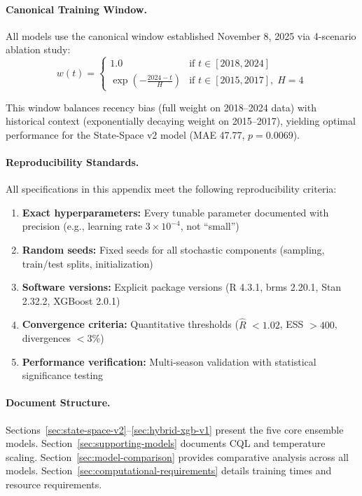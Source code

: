 \paragraph{Canonical Training Window.}
All models use the canonical window established November 8, 2025 via 4-scenario ablation study:
\begin{equation}
w(t) = \begin{cases}
1.0 & \text{if } t \in [2018, 2024] \\
\exp\left(-\frac{2024 - t}{H}\right) & \text{if } t \in [2015, 2017], \; H = 4
\end{cases}
\end{equation}

\noindent This window balances recency bias (full weight on 2018--2024 data) with historical context (exponentially decaying weight on 2015--2017), yielding optimal performance for the State-Space v2 model (MAE 47.77, $p = 0.0069$).

\paragraph{Reproducibility Standards.}
All specifications in this appendix meet the following reproducibility criteria:
\begin{enumerate}[itemsep=2pt,parsep=0pt]
    \item \textbf{Exact hyperparameters:} Every tunable parameter documented with precision (e.g., learning rate $3 \times 10^{-4}$, not ``small'')
    \item \textbf{Random seeds:} Fixed seeds for all stochastic components (sampling, train/test splits, initialization)
    \item \textbf{Software versions:} Explicit package versions (R 4.3.1, brms 2.20.1, Stan 2.32.2, XGBoost 2.0.1)
    \item \textbf{Convergence criteria:} Quantitative thresholds ($\hat{R}$ $< 1.02$, ESS $> 400$, divergences $< 3\%$)
    \item \textbf{Performance verification:} Multi-season validation with statistical significance testing
\end{enumerate}

\paragraph{Document Structure.}
Sections~\ref{sec:state-space-v2}--\ref{sec:hybrid-xgb-v1} present the five core ensemble models. Section~\ref{sec:supporting-models} documents CQL and temperature scaling. Section~\ref{sec:model-comparison} provides comparative analysis across all models. Section~\ref{sec:computational-requirements} details training times and resource requirements.

